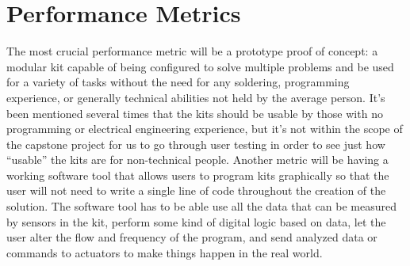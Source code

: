\documentclass[onecolumn, draftclsnofoot,10pt, compsoc]{IEEEtran}
\begin{document}
\section{Performance Metrics}
The most crucial performance metric will be a prototype proof of concept: a modular kit capable of being configured to solve multiple problems and be used for a variety of tasks without the need for any soldering, programming experience, or generally technical abilities not held by the average person.
It’s been mentioned several times that the kits should be usable by those with no programming or electrical engineering experience, but it’s not within the scope of the capstone project for us to go through user testing in order to see just how “usable” the kits are for non-technical people.
Another metric will be having a working software tool that allows users to program kits graphically so that the user will not need to write a single line of code throughout the creation of the solution.
The software tool has to be able use all the data that can be measured by sensors in the kit, perform some kind of digital logic based on data, let the user alter the flow and frequency of the program, and send analyzed data or commands to actuators to make things happen in the real world. 
\end{document}
